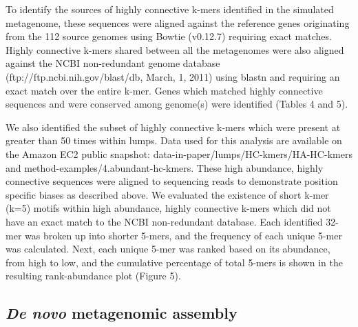 \documentclass[10pt]{article}
\begin{document}
To identify the sources of highly connective k-mers identified in the simulated metagenome, these sequences were aligned against the reference genes originating from the 112 source genomes using Bowtie (v0.12.7) requiring exact matches.   Highly connective k-mers shared between all the metagenomes were also aligned against the NCBI non-redundant genome database (ftp://ftp.ncbi.nih.gov/blast/db, March, 1, 2011) using blastn \cite{Altschul:1990p1335} and requiring an exact match over the entire k-mer.  Genes which matched highly connective sequences and were conserved among genome(s) were identified (Tables 4 and 5).

We also identified the subset of highly connective k-mers which were present at greater than 50 times within lumps. Data used for this analysis are available on the Amazon EC2 public snapshot: data-in-paper/lumps/HC-kmers/HA-HC-kmers and method-examples/4.abundant-hc-kmers. These high abundance, highly connective sequences were aligned to sequencing reads to demonstrate position specific biases as described above.   We evaluated the existence of short k-mer (k=5) motifs within high abundance, highly connective k-mers which did not have an exact match to the NCBI non-redundant database.  Each identified 32-mer was broken up into shorter 5-mers, and the frequency of each unique 5-mer was calculated.  Next, each unique 5-mer was ranked based on its abundance, from high to low, and the cumulative percentage of total 5-mers is shown in the resulting rank-abundance plot (Figure 5).
  
\subsection*{\emph{De novo} metagenomic assembly}
\end{document}
